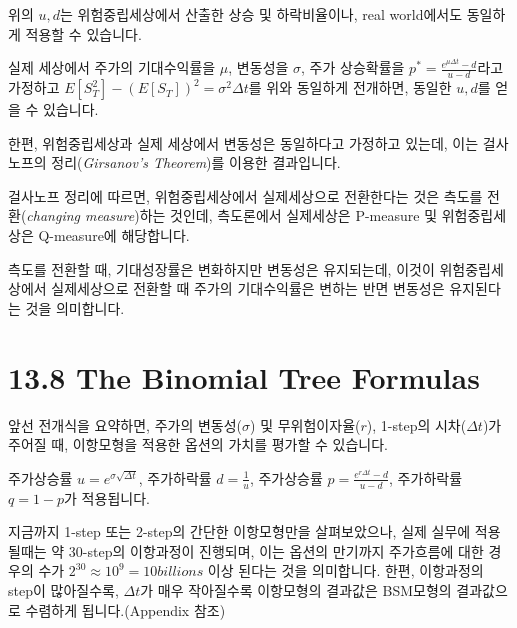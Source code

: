 \documentclass[
  letterpaper,
  DIV=11,
  numbers=noendperiod]{scrreprt}
\begin{document}
\begin{tcolorbox}[enhanced jigsaw, toprule=.15mm, breakable, left=2mm, leftrule=.75mm, opacitybacktitle=0.6, coltitle=black, rightrule=.15mm, colback=white, titlerule=0mm, bottomtitle=1mm, colframe=quarto-callout-important-color-frame, title=\textcolor{quarto-callout-important-color}{\faExclamation}\hspace{0.5em}{In Real-world u\&d}, toptitle=1mm, arc=.35mm, colbacktitle=quarto-callout-important-color!10!white, opacityback=0, bottomrule=.15mm]

위의 \(u,d\)는 위험중립세상에서 산출한 상승 및 하락비율이나, real
world에서도 동일하게 적용할 수 있습니다.

실제 세상에서 주가의 기대수익률을 \(\mu\), 변동성을 \(\sigma\), 주가
상승확률을 \(p^*=\frac{e^{\mu\Delta t}-d}{u-d}\)라고 가정하고
\(E[S_T^2]-(E[S_T])^2=\sigma^2\Delta t\)를 위와 동일하게 전개하면,
동일한 \(u,d\)를 얻을 수 있습니다.

한편, 위험중립세상과 실제 세상에서 변동성은 동일하다고 가정하고 있는데,
이는 걸사노프의 정리(\emph{Girsanov's Theorem})를 이용한 결과입니다.

걸사노프 정리에 따르면, 위험중립세상에서 실제세상으로 전환한다는 것은
측도를 전환(\emph{changing measure})하는 것인데, 측도론에서 실제세상은
P-measure 및 위험중립세상은 Q-measure에 해당합니다.

측도를 전환할 때, 기대성장률은 변화하지만 변동성은 유지되는데, 이것이
위험중립세상에서 실제세상으로 전환할 때 주가의 기대수익률은 변하는 반면
변동성은 유지된다는 것을 의미합니다.

\end{tcolorbox}

\section*{13.8 The Binomial Tree
Formulas}\label{the-binomial-tree-formulas}


앞선 전개식을 요약하면, 주가의 변동성(\(\sigma\)) 및
무위험이자율(\(r\)), 1-step의 시차(\(\Delta t\))가 주어질 때, 이항모형을
적용한 옵션의 가치를 평가할 수 있습니다.

주가상승률 \(u=e^{\sigma\sqrt{\Delta t}}\), 주가하락률
\(d=\frac{1}{u}\), 주가상승률 \(p=\frac{e^{r\Delta t}-d}{u-d}\),
주가하락률 \(q=1-p\)가 적용됩니다.

지금까지 1-step 또는 2-step의 간단한 이항모형만을 살펴보았으나, 실제
실무에 적용될때는 약 30-step의 이항과정이 진행되며, 이는 옵션의 만기까지
주가흐름에 대한 경우의 수가 \(2^{30}\approx 10^9=10billions\) 이상
된다는 것을 의미합니다. 한편, 이항과정의 step이 많아질수록,
\(\Delta t\)가 매우 작아질수록 이항모형의 결과값은 BSM모형의 결과값으로
수렴하게 됩니다.(Appendix 참조)
\end{document}

